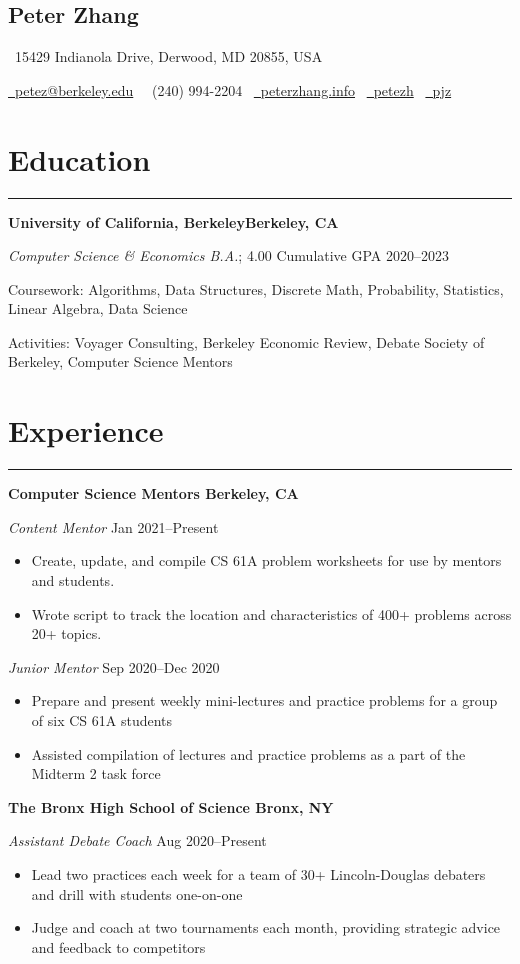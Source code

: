 \documentclass[11pt]{article}
\newcommand{\name}[1]{\begin{center}\section*{\huge \color{highlight} #1}\vspace{-0.5cm}\end{center}}
\newcommand{\topinfo}[1]{\begin{center}\vspace{-0.2cm}#1\vspace{-0.2cm}\end{center}}
\newcommand{\resumesection}[1]{\vspace{-0.6cm}\section*{\color{highlight}#1}\vspace{-0.3cm}\hrule\vspace{0.2cm}}
\begin{document}
\name{Peter Zhang}
\topinfo{\faHome \ 15429 Indianola Drive, Derwood, MD 20855, USA}
\topinfo{\href{mailto:petez@berkeley.edu}{\faEnvelope \ petez@berkeley.edu} \ \faPhone \ (240) 994-2204 \ \href{https://peterzhang.info/}{\faBriefcase \ peterzhang.info} \  \href{https://github.com/petezh}{\faGithub \ petezh} \  \href{https://www.linkedin.com/in/pjz/}{\faLinkedinSquare \ pjz}}

\resumesection{Education}

\textbf{University of California, Berkeley\hfill Berkeley, CA} \par
\textit{Computer Science \& Economics B.A.}; 4.00 Cumulative GPA \hfill 2020--2023\par
Coursework: Algorithms, Data Structures, Discrete Math, Probability, Statistics, Linear Algebra, Data Science\par
Activities: Voyager Consulting, Berkeley Economic Review, Debate Society of Berkeley, Computer Science Mentors

\resumesection{Experience}

\textbf{Computer Science Mentors \hfill Berkeley, CA} \par
\textit{Content Mentor} \hfill Jan 2021--Present \par
\begin{itemize}
	\item Create, update, and compile CS 61A problem worksheets for use by mentors and students.
	\item Wrote script to track the location and characteristics of 400+ problems across 20+ topics.
\end{itemize}\vspace{0.1cm}

\textit{Junior Mentor} \hfill Sep 2020--Dec 2020 \par
\begin{itemize}
	\item Prepare and present weekly mini-lectures and practice problems for a group of six CS 61A students
	\item Assisted compilation of lectures and practice problems as a part of the Midterm 2 task force
\end{itemize}\vspace{0.1cm}

\textbf{The Bronx High School of Science \hfill Bronx, NY} \par
\textit{Assistant Debate Coach}  \hfill Aug 2020--Present
\begin{itemize}
	\item Lead two practices each week for a team of 30+ Lincoln-Douglas debaters and drill with students one-on-one
	\item Judge and coach at two tournaments each month, providing strategic advice and feedback to competitors
\end{itemize}\vspace{0.1cm}
\end{document}
